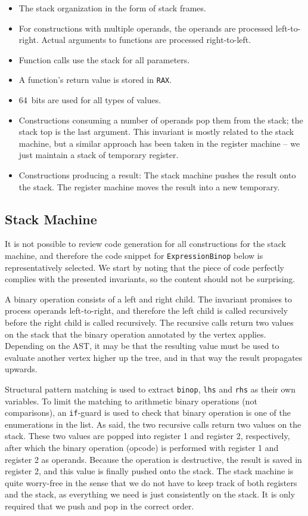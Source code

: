 \begin{itemize}
    \item The stack organization in the form of stack frames.
    \item For constructions with multiple operands, the operands are processed left-to-right. Actual arguments to functions are processed right-to-left.
    \item Function calls use the stack for all parameters.
    \item A function's return value is stored in \texttt{RAX}.
    \item \SI{64}{bits} are used for all types of values.
    \item Constructions consuming a number of operands pop them from the stack; the stack top is the last argument. This invariant is mostly related to the stack machine, but a similar approach has been taken in the register machine -- we just maintain a stack of temporary register.
    \item Constructions producing a result: The stack machine pushes the result onto the stack. The register machine moves the result into a new temporary. 
\end{itemize}

\subsection{Stack Machine}
It is not possible to review code generation for all constructions for the stack machine, and therefore the code snippet for \texttt{ExpressionBinop} below is representatively selected. We start by noting that the piece of code perfectly complies with the presented invariants, so the content should not be surprising.

A binary operation consists of a left and right child. The invariant promises to process operands left-to-right, and therefore the left child is called recursively before the right child is called recursively. The recursive calls return two values on the stack that the binary operation annotated by the vertex applies. Depending on the AST, it may be that the resulting value must be used to evaluate another vertex higher up the tree, and in that way the result propagates upwards.

Structural pattern matching is used to extract \texttt{binop}, \texttt{lhs} and \texttt{rhs} as their own variables. To limit the matching to arithmetic binary operations (not comparisons), an \texttt{if}-guard is used to check that binary operation is one of the enumerations in the list. As said, the two recursive calls return two values on the stack. These two values are popped into register 1 and register 2, respectively, after which the binary operation (opcode) is performed with register 1 and register 2 as operands. Because the operation is destructive, the result is saved in register 2, and this value is finally pushed onto the stack. The stack machine is quite worry-free in the sense that we do not have to keep track of both registers and the stack, as everything we need is just consistently on the stack. It is only required that we push and pop in the correct order.

